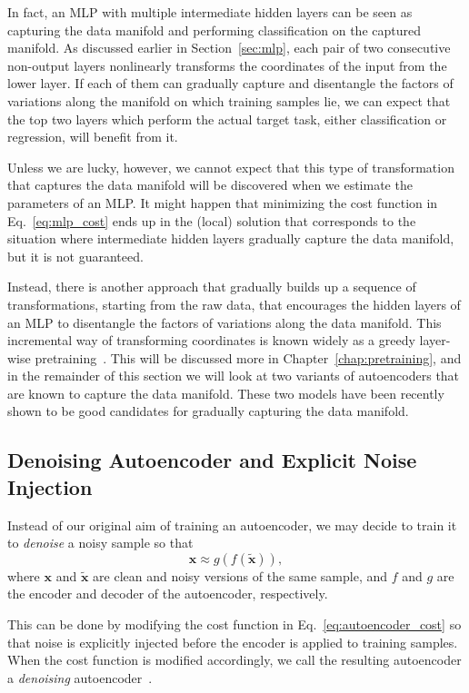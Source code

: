 \documentclass{now}
\newcommand{\vect}[1]{\mathbf{#1}}
\newcommand{\vx}[0]{\vect{x}}
\begin{document}
In fact, an MLP with multiple intermediate hidden layers can be seen as
capturing the data manifold and performing classification on the captured
manifold. As discussed earlier in Section~\ref{sec:mlp}, each pair of two
consecutive non-output layers nonlinearly transforms the coordinates of the
input from the lower layer. If each of them can gradually capture and
disentangle the factors of variations along the manifold on which training
samples lie, we can expect that the top two layers which perform the actual
target task, either classification or regression, will benefit from it.

Unless we are lucky, however, we cannot expect that this type of transformation
that captures the data manifold will be discovered when we estimate the
parameters of an MLP. It might happen that minimizing the cost function in
Eq.~\eqref{eq:mlp_cost} ends up in the (local) solution that corresponds to the
situation where intermediate hidden layers gradually capture the data manifold,
but it is not guaranteed.

Instead, there is another approach that gradually builds up a sequence of
transformations, starting from the raw data, that encourages the hidden layers
of an MLP to disentangle the factors of variations along the data manifold.
This incremental way of transforming coordinates is known widely as a greedy
layer-wise pretraining~\citep{Hinton2006}. This will be discussed more in
Chapter~\ref{chap:pretraining}, and in the remainder of this section we will
look at two variants of autoencoders that are known to capture the data
manifold. These two models have been recently shown to be good candidates for
gradually capturing the data manifold.


\subsection{Denoising Autoencoder and Explicit Noise
Injection}
\label{sec:dae}

Instead of our original aim of training an autoencoder, we may decide to train
it to \textit{denoise} a noisy sample so that 
\[
\vx \approx g(f(\tilde{\vx})),
\]
where $\vx$ and $\tilde{\vx}$ are clean and noisy versions of the same sample,
and $f$ and $g$ are the encoder and decoder of the autoencoder, respectively. 

This can be done by modifying the cost function in
Eq.~\eqref{eq:autoencoder_cost} so that noise is explicitly injected before the
encoder is applied to training samples.  When the cost function is modified
accordingly, we call the resulting autoencoder a \textit{denoising}
autoencoder~\citep{Vincent2010}. 
\end{document}
